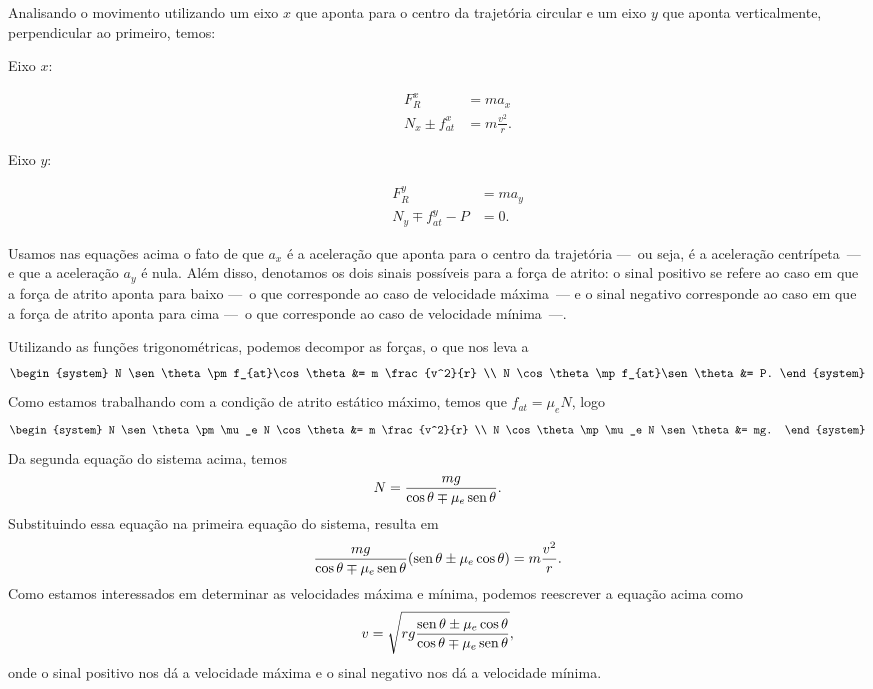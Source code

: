 Analisando o movimento utilizando um eixo $x$ que aponta para o centro da trajetória circular e um eixo $y$ que aponta verticalmente, perpendicular ao primeiro, temos:
\begin{description}
    \item[Eixo $x$:]
        \begin{align}
            F_R^x &= m a_x \\
            N_x \pm f_{at}^x &= m \frac{v^2}{r}.
        \end{align}
    \item[Eixo $y$:]
        \begin{align}
            F_R^y &= m a_y \\
            N_y \mp f_{at}^y - P &= 0.
        \end{align}
\end{description}
%
Usamos nas equações acima o fato de que $a_x$ é a aceleração que aponta para o centro da trajetória ---~ou seja, é a aceleração centrípeta~--- e que a aceleração $a_y$ é nula. Além disso, denotamos os dois sinais possíveis para a força de atrito: o sinal positivo se refere ao caso em que a força de atrito aponta para baixo ---~o que corresponde ao caso de velocidade máxima~--- e o sinal negativo corresponde ao caso em que a força de atrito aponta para cima ---~o que corresponde ao caso de velocidade mínima~---.

Utilizando as funções trigonométricas, podemos decompor as forças, o que nos leva a
\begin{equation}
\begin{system}
    N \sen\theta \pm f_{at}\cos\theta &= m \frac{v^2}{r} \\
    N \cos\theta \mp f_{at}\sen\theta &= P.
\end{system}
\end{equation}
%
Como estamos trabalhando com a condição de atrito estático máximo, temos que $f_{at} = \mu_e N$, logo
\begin{equation}
\begin{system}
    N \sen\theta \pm \mu_e N \cos\theta &= m \frac{v^2}{r} \\
    N \cos\theta \mp \mu_e N \sen\theta &= mg.
\end{system}
\end{equation}
%
Da segunda equação do sistema acima, temos
\begin{equation}
    N = \frac{mg}{\cos\theta \mp \mu_e\operatorname{sen}\theta}.
\end{equation}
%
Substituindo essa equação na primeira equação do sistema, resulta em
\begin{equation}
    \frac{mg}{\cos\theta \mp \mu_e\operatorname{sen}\theta} (\operatorname{sen}\theta \pm \mu_e \cos\theta) = m\frac{v^2}{r}.
\end{equation}
%
Como estamos interessados em determinar as velocidades máxima e mínima, podemos reescrever a equação acima como
\begin{equation}
    v = \sqrt{rg \frac{\operatorname{sen}\theta \pm \mu_e \cos\theta}{\cos\theta \mp \mu_e\operatorname{sen}\theta}},
\end{equation}
%
onde o sinal positivo nos dá a velocidade máxima e o sinal negativo nos dá a velocidade mínima.

